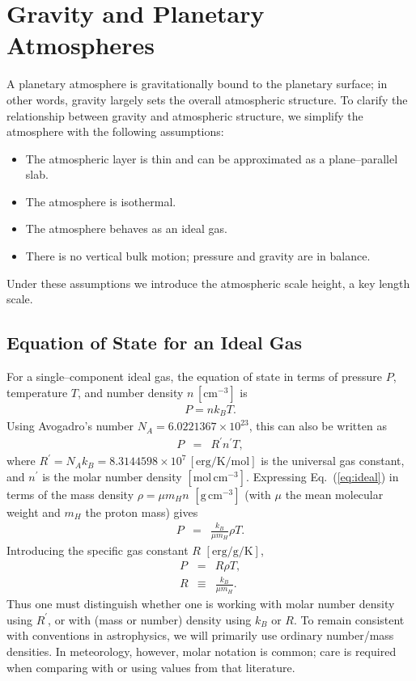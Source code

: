 \section{Gravity and Planetary Atmospheres}

A planetary atmosphere is gravitationally bound to the planetary surface; in other words, gravity largely sets the overall atmospheric structure. To clarify the relationship between gravity and atmospheric structure, we simplify the atmosphere with the following assumptions:
\begin{itemize}
    \item The atmospheric layer is thin and can be approximated as a plane–parallel slab.
    \item The atmosphere is isothermal.
    \item The atmosphere behaves as an ideal gas.
    \item There is no vertical bulk motion; pressure and gravity are in balance.
\end{itemize}
Under these assumptions we introduce the atmospheric scale height, a key length scale.

\subsection*{Equation of State for an Ideal Gas \label{ss:idealgass}}

For a single–component ideal gas, the equation of state in terms of pressure $P$, temperature $T$, and number density $n\,[\mathrm{cm^{-3}}]$ is
\begin{eqnarray}
\label{eq:ideal}
P = n k_B T .
\end{eqnarray}
Using Avogadro’s number $N_A=6.0221367 \times 10^{23}$, this can also be written as
\begin{eqnarray}
\label{eq:idealRastmol}
P &=& R^\prime n^\prime T ,
\end{eqnarray}
where $R^\prime = N_A k_B = 8.3144598 \times 10^7\, [\mathrm{erg/K/mol}]$ is the universal gas constant, and $n^\prime$ is the molar number density $[\mathrm{mol \, cm^{-3}}]$. Expressing Eq.~(\ref{eq:ideal}) in terms of the mass density $\rho = \mu m_H n \,\,[\mathrm{g \, cm^{-3}}]$ (with $\mu$ the mean molecular weight and $m_H$ the proton mass) gives
\begin{eqnarray}
\label{eq:idealRast}
P &=& \frac{k_B}{\mu m_H} \rho T .
\end{eqnarray}
Introducing the specific gas constant $R \,\,[\mathrm{erg/g/K}]$,
\begin{eqnarray}
\label{eq:idealR}
P &=& R \rho T ,\\
R &\equiv& \frac{k_B}{\mu m_H} .
\end{eqnarray}
Thus one must distinguish whether one is working with molar number density using $R^\prime$, or with (mass or number) density using $k_B$ or $R$. To remain consistent with conventions in astrophysics, we will primarily use ordinary number/mass densities. In meteorology, however, molar notation is common; care is required when comparing with or using values from that literature.

